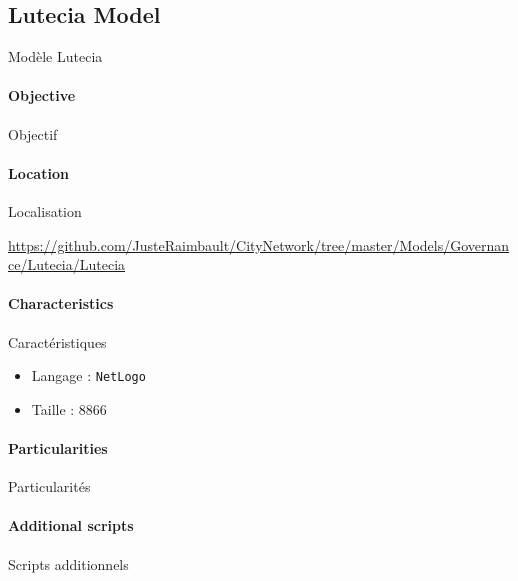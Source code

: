 

\subsection{Lutecia Model}{Modèle Lutecia}

\paragraph{Objective}{Objectif}


\paragraph{Location}{Localisation}

\url{https://github.com/JusteRaimbault/CityNetwork/tree/master/Models/Governance/Lutecia/Lutecia}

\paragraph{Characteristics}{Caractéristiques}

\begin{itemize}
\item Langage : \texttt{NetLogo}
\item Taille : 8866
\end{itemize}


\paragraph{Particularities}{Particularités}




\paragraph{Additional scripts}{Scripts additionnels}


